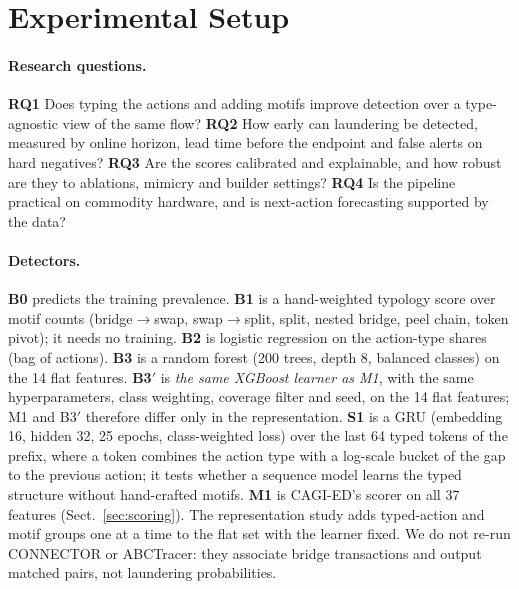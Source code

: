 \section{Experimental Setup}
\label{sec:setup}

\paragraph{Research questions.}
\textbf{RQ1} Does typing the actions and adding motifs improve detection over a type-agnostic view of the same flow?
\textbf{RQ2} How early can laundering be detected, measured by online horizon, lead time before the endpoint and false alerts on hard negatives?
\textbf{RQ3} Are the scores calibrated and explainable, and how robust are they to ablations, mimicry and builder settings?
\textbf{RQ4} Is the pipeline practical on commodity hardware, and is next-action forecasting supported by the data?

\paragraph{Detectors.}
\textbf{B0} predicts the training prevalence.
\textbf{B1} is a hand-weighted typology score over motif counts (bridge$\to$swap, swap$\to$split, split, nested bridge, peel chain, token pivot); it needs no training.
\textbf{B2} is logistic regression on the action-type shares (bag of actions).
\textbf{B3} is a random forest (200 trees, depth 8, balanced classes) on the 14 flat features.
\textbf{B3$'$} is \emph{the same XGBoost learner as M1}, with the same hyperparameters, class weighting, coverage filter and seed, on the 14 flat features; M1 and B3$'$ therefore differ only in the representation.
\textbf{S1} is a GRU (embedding 16, hidden 32, 25 epochs, class-weighted loss) over the last 64 typed tokens of the prefix, where a token combines the action type with a log-scale bucket of the gap to the previous action; it tests whether a sequence model learns the typed structure without hand-crafted motifs.
\textbf{M1} is CAGI-ED's scorer on all 37 features (Sect.~\ref{sec:scoring}).
The representation study adds typed-action and motif groups one at a time to the flat set with the learner fixed.
We do not re-run CONNECTOR or ABCTracer: they associate bridge transactions and output matched pairs, not laundering probabilities.

